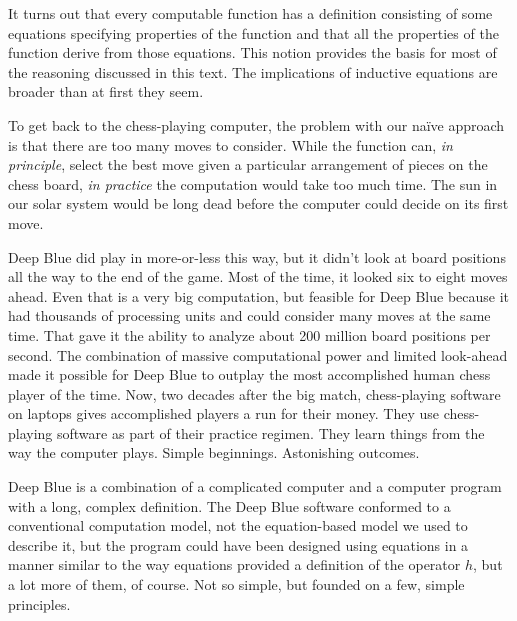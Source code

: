 It turns out that every computable function has a definition consisting
of some equations specifying properties of the function
and that all the properties of the function derive
from those equations.
This notion provides the basis for most of the reasoning
discussed in this text.
The implications of inductive equations
are broader than at first they seem.

To get back to the chess-playing computer, the problem with our
na\"ive approach is that there are too many moves to consider.
While the function can, \emph{in principle},
select the best move given a particular arrangement of pieces on the chess board,
\emph{in practice} the computation
would take too much time.
The sun in our solar system would be long dead
before the computer could decide on its first move.

Deep Blue
did play in more-or-less this way, but it didn't look at board positions
all the way to the end of the game. Most of the time, it looked
six to eight moves ahead. Even that is a very big computation,
but feasible for Deep Blue because it had
thousands of processing units and could consider many moves at the same time.
That gave it the ability to analyze about 200 million board positions per second.
The combination of massive computational power and limited look-ahead
made it possible for Deep Blue to outplay
the most accomplished human chess player of the time.
Now, two decades after the big match,
chess-playing software on laptops
gives accomplished players a run for their money.
They use chess-playing software as part of their
practice regimen. They learn things from the way
the computer plays. Simple beginnings.
Astonishing outcomes.

Deep Blue is a combination of a complicated computer
and a computer program with a long, complex definition.
The Deep Blue software conformed to a conventional computation model,
not the equation-based model we used to describe it,
but the program could have been designed
using equations in a manner similar to the
way equations provided a definition of the operator $h$,
but a lot more of them, of course.
Not so simple, but founded on a few, simple principles.

